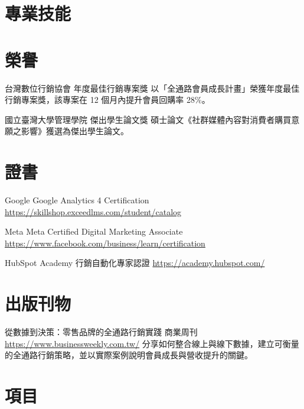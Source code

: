 \documentclass[a4paper, serif, 10pt]{moderncv}
\begin{document}
\section{專業技能}

\section{榮譽}

        {台灣數位行銷協會}
        {年度最佳行銷專案獎}
        {}
        {}
        {以「全通路會員成長計畫」榮獲年度最佳行銷專案獎，該專案在 12 個月內提升會員回購率 28\%。}

        {國立臺灣大學管理學院}
        {傑出學生論文獎}
        {}
        {}
        {碩士論文《社群媒體內容對消費者購買意願之影響》獲選為傑出學生論文。}
\section{證書}

        {Google}
        {Google Analytics 4 Certification}
        {\url{https://skillshop.exceedlms.com/student/catalog}}
        {}
        {}

        {Meta}
        {Meta Certified Digital Marketing Associate}
        {\url{https://www.facebook.com/business/learn/certification}}
        {}
        {}

        {HubSpot Academy}
        {行銷自動化專家認證}
        {\url{https://academy.hubspot.com/}}
        {}
        {}
\section{出版刊物}

        {從數據到決策：零售品牌的全通路行銷實踐}
        {商業周刊}
        {\url{https://www.businessweekly.com.tw/}}
        {}
        {分享如何整合線上與線下數據，建立可衡量的全通路行銷策略，並以實際案例說明會員成長與營收提升的關鍵。}
\section{項目}
\end{document}
